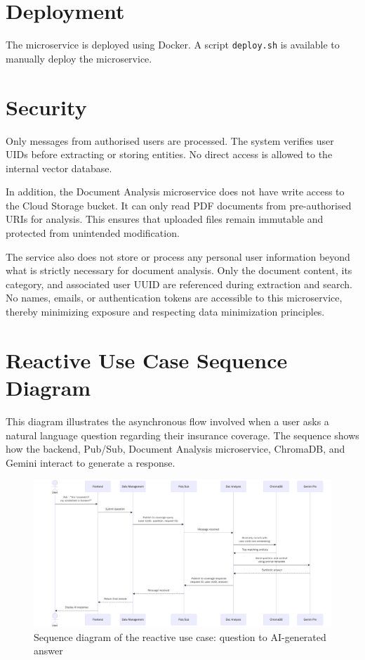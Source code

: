 \section{Deployment}

The microservice is deployed using Docker. A script \texttt{deploy.sh} is available to manually deploy the microservice.

\section{Security}
Only messages from authorised users are processed. The system verifies user UIDs before extracting or storing entities. No direct access is allowed to the internal vector database.

In addition, the Document Analysis microservice does not have write access to the Cloud Storage bucket. It can only read PDF documents from pre-authorised URIs for analysis. This ensures that uploaded files remain immutable and protected from unintended modification.

The service also does not store or process any personal user information beyond what is strictly necessary for document analysis. Only the document content, its category, and associated user UUID are referenced during extraction and search. No names, emails, or authentication tokens are accessible to this microservice, thereby minimizing exposure and respecting data minimization principles.

\section{Reactive Use Case Sequence Diagram}

This diagram illustrates the asynchronous flow involved when a user asks a natural language question regarding their insurance coverage. The sequence shows how the backend, Pub/Sub, Document Analysis microservice, ChromaDB, and Gemini interact to generate a response.

\begin{figure}
    \centering
    \includegraphics[width=\textheight]{docanalysis/reactive-sequence-diagram.png}
    \caption{Sequence diagram of the reactive use case: question to AI-generated answer}
    \label{fig:sequence-reactive}
\end{figure}
